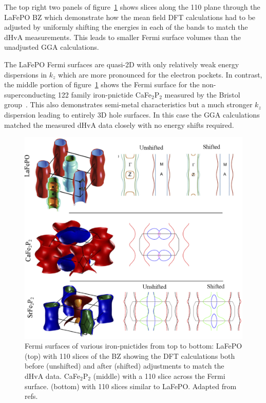 The top right two panels of figure~\ref{Fig:Intro:PnictideFS} shows slices along the 110 plane through the LaFePO \ac{BZ} which demonstrate how the mean field \ac{DFT} calculations had to be adjusted by uniformly shifting the energies in each of the bands to match the \ac{dHvA} measurements. This leads to smaller Fermi surface volumes than the unadjusted \ac{GGA} calculations.

The LaFePO Fermi surfaces are quasi-2D with only relatively weak energy dispersions in $k_z$ which are more pronounced for the electron pockets. In contrast, the middle portion of figure~\ref{Fig:Intro:PnictideFS} shows the Fermi surface for the non-superconducting 122 family iron-pnictide CaFe$_2$P$_2$ measured by the Bristol group~\cite{Coldea2009}. This also demonstrates semi-metal characteristics but a much stronger $k_z$ dispersion leading to entirely 3D hole surfaces. In this case the \ac{GGA} calculations matched the measured \ac{dHvA} data closely with no energy shifts required.
\begin{figure}[htbp]
    \begin{center}
        \includegraphics[scale=0.7]{Chapter-Introduction/Figures/PnictideFS/PnictideFS}
        \caption{Fermi surfaces of various iron-pnictides from top to bottom: LaFePO (top) with 110 slices of the \ac{BZ} showing the \ac{DFT} calculations both before (unshifted) and after (shifted) adjustments to match the \ac{dHvA} data. CaFe$_2$P$_2$ (middle) with a 110 slice across the Fermi surface. \SrFeP{} (bottom) with 110 slices similar to LaFePO. Adapted from refs.~\cite{Carrington2009, Coldea2009, Carrington2011, Analytis2009}}
        \label{Fig:Intro:PnictideFS}
    \end{center}
\end{figure}

